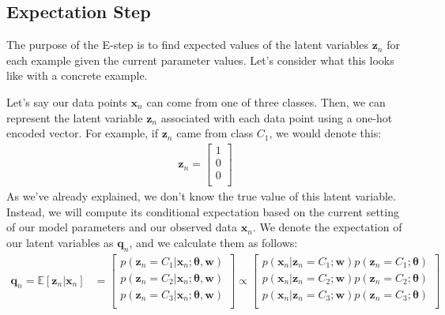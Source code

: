 
\subsection{Expectation Step}

The purpose of the E-step is to find expected values of the latent variables $\textbf{z}_n$ for each example given the current parameter values. Let's consider what this looks like with a concrete example.

Let's say our data points $\textbf{x}_n$ can come from one of three classes. Then, we can represent the latent variable $\textbf{z}_n$ associated with each data point using a one-hot encoded vector. For example, if $\textbf{z}_n$ came from class $C_1$, we would denote this:
\begin{align*}
    \textbf{z}_n = 
        \begin{bmatrix}
            1 \\
            0 \\
            0 \\
        \end{bmatrix}
\end{align*}
As we've already explained, we don't know the true value of this latent variable. Instead, we will compute its conditional expectation based on the current setting of our model parameters and our observed data $\textbf{x}_n$. We denote the expectation of our latent variables as $\textbf{q}_n$, and we calculate them as follows:
\begin{align*}
    \textbf{q}_n = \mathbb{E}[\textbf{z}_n | \textbf{x}_n] &= \begin{bmatrix}
            p(\textbf{z}_n = C_1 | \textbf{x}_n; \boldsymbol{\theta}, \textbf{w}) \\
            p(\textbf{z}_n = C_2 | \textbf{x}_n; \boldsymbol{\theta}, \textbf{w}) \\
            p(\textbf{z}_n = C_3 | \textbf{x}_n; \boldsymbol{\theta}, \textbf{w}) \\
        \end{bmatrix} 
        \propto \begin{bmatrix}
            p(\textbf{x}_n | \textbf{z}_n = C_1; \textbf{w})p(\textbf{z}_n = C_1; \boldsymbol{\theta}) \\
            p(\textbf{x}_n | \textbf{z}_n = C_2; \textbf{w})p(\textbf{z}_n = C_2; \boldsymbol{\theta}) \\
            p(\textbf{x}_n | \textbf{z}_n = C_3; \textbf{w})p(\textbf{z}_n = C_3; \boldsymbol{\theta}) \\
        \end{bmatrix} \\
\end{align*}

